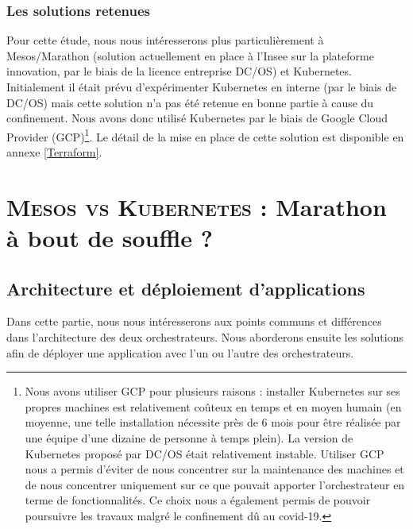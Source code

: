 \documentclass[11pt,fleqn]{book} %
\begin{document}
\section{Les solutions retenues}
Pour cette étude, nous nous intéresserons plus particulièrement à Mesos/Marathon (solution actuellement en place à l'Insee sur la plateforme innovation, par le biais de la licence entreprise DC/OS) et Kubernetes. Initialement il était prévu d'expérimenter Kubernetes en interne (par le biais de DC/OS) mais cette solution n'a pas été retenue en bonne partie à cause du confinement. Nous avons donc utilisé Kubernetes par le biais de Google Cloud Provider (GCP)\footnote{Nous avons utiliser GCP pour plusieurs raisons : installer Kubernetes sur ses propres machines est relativement coûteux en temps et en moyen humain (en moyenne, une telle installation nécessite près de 6 mois pour être réalisée par une équipe d'une dizaine de personne à temps plein). La version de Kubernetes proposé par DC/OS était relativement instable. Utiliser GCP nous a permis d'éviter de nous concentrer sur la maintenance des machines et de nous concentrer uniquement sur ce que pouvait apporter l'orchestrateur en terme de fonctionnalités. Ce choix nous a également permis de pouvoir poursuivre les travaux malgré le confinement dû au covid-19.}. Le détail de la mise en place de cette solution est disponible en annexe \ref{Terraform}.\newline



\part{\textcolor{ocre}{\textsc{Mesos vs Kubernetes} : Marathon à bout de souffle ?}}



\chapter{Architecture et déploiement d'applications}
\vspace{-2cm}
Dans cette partie, nous nous intéresserons aux points communs et différences dans l'architecture des deux orchestrateurs. Nous aborderons ensuite les solutions afin de déployer une application avec l'un ou l'autre des orchestrateurs.
\end{document}
